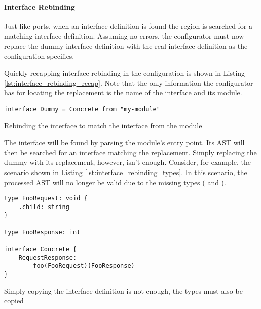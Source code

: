 \paragraph{Interface Rebinding}

Just like ports, when an interface definition is found the  region
is searched for a matching interface definition. Assuming no errors, the
configurator must now replace the dummy interface definition with the real
interface definition as the configuration specifies.

Quickly recapping interface rebinding in the configuration is shown in Listing
\ref{lst:interface_rebinding_recap}. Note that the only information the
configurator has for locating the replacement is the name of the interface and
its module.

\begin{listing}[H]
\begin{verbatim}
interface Dummy = Concrete from "my-module"
\end{verbatim}

\caption{Rebinding the interface  to match the interface
     from the module }

\label{lst:interface_rebinding_recap}

\end{listing}

The interface will be found by parsing the module's entry point. Its AST will
then be searched for an interface matching the replacement. Simply replacing
the dummy with its replacement, however, isn't enough. Consider, for example,
the scenario shown in Listing \ref{lst:interface_rebinding_types}. In this
scenario, the processed AST will no longer be valid due to the missing types
( and ).

\begin{listing}[H]
\begin{verbatim}
type FooRequest: void {
    .child: string
}

type FooResponse: int

interface Concrete {
    RequestResponse:
        foo(FooRequest)(FooResponse)
}
\end{verbatim}

\caption{Simply copying the interface definition is not enough, the types must
    also be copied}

\label{lst:interface_rebinding_types}
\end{listing}

